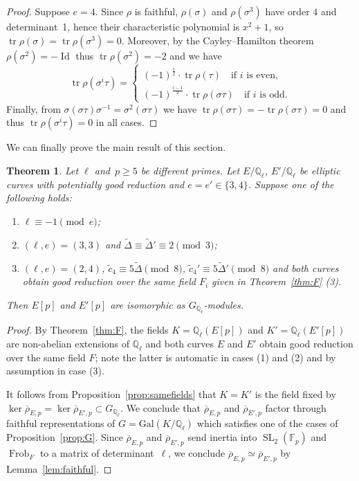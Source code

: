 \documentclass[12pt]{amsart}
\numberwithin{equation}{section}
\newtheorem{theorem}[equation]{Theorem}
\theoremstyle{definition}
\newcommand{\F}{\mathbb{F}}
\newcommand{\Q}{\mathbb{Q}}
\newcommand{\rhobar}{{\overline{\rho}}}
\newcommand{\Gal}{\text{Gal}}
\DeclareMathOperator{\SL}{SL}
\DeclareMathOperator{\Frob}{Frob}
\DeclareMathOperator{\Id}{Id}
\DeclareMathOperator{\tr}{tr}
\begin{document}
\begin{proof}
Suppose $e=4$.  Since $\rho$ is faithful,  
$\rho(\sigma)$ and $\rho(\sigma^3)$ have order $4$ and determinant~1, hence their characteristic polynomial is $x^2 + 1$, so $\tr \rho(\sigma) = \tr \rho(\sigma^3) = 0$. Moreover, by the Cayley--Hamilton theorem $\rho(\sigma^2)=-\Id$ thus $\tr \rho(\sigma^2) = -2$ and we have
$$\tr \rho(\sigma^i \tau) =      
\begin{cases}
 (-1)^\frac{i}{2} \cdot \tr \rho(\tau) \quad \text{if }i\text{ is even,} \\
(-1)^\frac{i-1}{2} \cdot \tr \rho(\sigma \tau) \quad \text{if }i\text{ is odd.}
\end{cases} $$
Finally, from $\sigma (\sigma \tau) \sigma^{-1} = \sigma^2 (\sigma \tau)$ we have $\tr \rho(\sigma \tau) = - \tr \rho(\sigma \tau) = 0$ and thus $\tr \rho(\sigma^i \tau) = 0$ in all cases.
\end{proof}
We can finally prove the main result of this section.

\begin{theorem} \label{thm:uniqueTorsion}
    Let $\ell$ and~$p \geq 5$ be different primes. Let $E/\Q_\ell$, $E'/\Q_\ell $ be elliptic curves with potentially good reduction 
    and $e = e' \in \{3,4\}$. 
    Suppose one of the following holds:
\begin{enumerate}[(1)]
    \item $\ell \equiv -1 \pmod{e}$; 
    \item $(\ell,e) = (3,3)$ and $\tilde{\Delta} \equiv \tilde{\Delta}' \equiv 2 \pmod{3}$; 
    \item $(\ell,e) = (2,4)$, $\tilde{c}_4 \equiv 5 \tilde{\Delta} \pmod{8}$, $\tilde{c}_4' \equiv 5 \tilde{\Delta}' \pmod{8}$ and both curves obtain good reduction over the same field $F_i$ given in Theorem~\ref{thm:F} (3).
\end{enumerate}
Then $E[p]$ and $E'[p]$ are isomorphic as $G_{\Q_\ell}$-modules.
\end{theorem}
\begin{proof}
By Theorem~\ref{thm:F}, the fields $K=\Q_\ell(E[p])$ and $K'=\Q_\ell(E'[p])$ are non-abelian extensions of $\Q_\ell$ and both curves $E$ and $E'$ obtain good reduction over the same field $F$; note the latter is automatic in cases (1) and (2) and by assumption in case (3). 

It follows from Proposition~\ref{prop:samefields} that $K = K'$ is the field fixed by $\ker \rhobar_{E,p} = \ker \rhobar_{E',p} \subset G_{\Q_\ell}$. We conclude that  $\rhobar_{E,p}$ and 
$\rhobar_{E',p}$ factor through faithful representations of  $G = \Gal(K/\Q_\ell)$ which satisfies one of the cases of Proposition~\ref{prop:G}. Since $\rhobar_{E,p}$ and 
$\rhobar_{E',p}$ send inertia into $\SL_2(\F_p)$ and $\Frob_F$ to a matrix of determinant~$\ell$, we conclude $\rhobar_{E,p} \simeq \rhobar_{E',p}$
by Lemma~\ref{lem:faithful}.
\end{proof}
\end{document}
